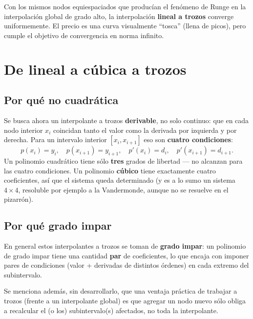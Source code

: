 \documentclass[12pt,a4paper]{article}
\begin{document}


\begin{keybox}
Con los mismos nodos equiespaciados que producían el fenómeno de Runge en la
interpolación global de grado alto, la interpolación \textbf{lineal a
trozos} converge uniformemente. El precio es una curva visualmente ``tosca''
(llena de picos), pero cumple el objetivo de convergencia en norma infinito.
\end{keybox}

\section{De lineal a cúbica a trozos}

\subsection{Por qué no cuadrática}

Se busca ahora un interpolante a trozos \textbf{derivable}, no solo
continuo: que en cada nodo interior $x_i$ coincidan tanto el valor como la
derivada por izquierda y por derecha. Para un intervalo interior
$[x_i,x_{i+1}]$ eso son \textbf{cuatro condiciones}:
\[
p(x_i)=y_i,\quad p(x_{i+1})=y_{i+1},\quad p'(x_i)=d_i,\quad p'(x_{i+1})=d_{i+1}.
\]
Un polinomio cuadrático tiene sólo \textbf{tres} grados de libertad --- no
alcanzan para las cuatro condiciones. Un polinomio \textbf{cúbico} tiene
exactamente cuatro coeficientes, así que el sistema queda determinado (y es
a lo sumo un sistema $4\times 4$, resoluble por ejemplo a la Vandermonde,
aunque no se resuelve en el pizarrón).

\subsection{Por qué grado impar}

En general estos interpolantes a trozos se toman de \textbf{grado impar}:
un polinomio de grado impar tiene una cantidad \textbf{par} de coeficientes,
lo que encaja con imponer pares de condiciones (valor + derivadas de
distintos órdenes) en cada extremo del subintervalo.

\begin{notebox}
Se menciona además, sin desarrollarlo, que una ventaja práctica de trabajar
a trozos (frente a un interpolante global) es que agregar un nodo nuevo
sólo obliga a recalcular el (o los) subintervalo(s) afectados, no toda la
interpolante.
\end{notebox}
\end{document}
